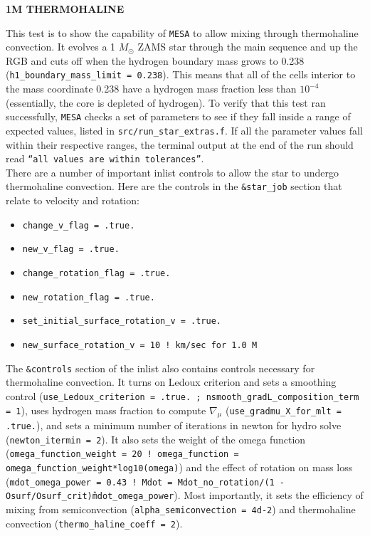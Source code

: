 \documentclass{article}
\begin{document}
	
	\begin{center}
	  \begin{Large}
	    \textbf{1M THERMOHALINE}\\
	  \end{Large}
	\end{center}

        This test is to show the capability of \texttt{MESA} to allow mixing through thermohaline convection.  It evolves a 1 $M_\odot$ ZAMS star through the main sequence and up the RGB and cuts off when the hydrogen boundary mass grows to 0.238 (\texttt{h1\_boundary\_mass\_limit = 0.238}).  This means that all of the cells interior to the mass coordinate 0.238 have a hydrogen mass fraction less than $10^{-4}$ (essentially, the core is depleted of hydrogen).  To verify that this test ran successfully, \texttt{MESA} checks a set of parameters to see if they fall inside a range of expected values, listed in \texttt{src/run\_star\_extras.f}.  If all the parameter values fall within their respective ranges, the terminal output at the end of the run should read \texttt{``all values are within tolerances''}.\\

        There are a number of important inlist controls to allow the star to undergo thermohaline convection.  Here are the controls in the \texttt{\&star\_job} section that relate to velocity and rotation:

        \begin{itemize}
        \item \texttt{change\_v\_flag = .true.}
        \item \texttt{new\_v\_flag = .true.}
        \item \texttt{change\_rotation\_flag = .true.}
        \item \texttt{new\_rotation\_flag = .true.}
        \item \texttt{set\_initial\_surface\_rotation\_v = .true.}
        \item \texttt{new\_surface\_rotation\_v = 10 ! km/sec    for 1.0 M}
        \end{itemize}

        The \texttt{\&controls} section of the inlist also contains controls necessary for thermohaline convection.  It turns on Ledoux criterion and sets a smoothing control (\texttt{use\_Ledoux\_criterion = .true. ; nsmooth\_gradL\_composition\_term = 1}), uses hydrogen mass fraction to compute $\nabla{_\mu}$ (\texttt{use\_gradmu\_X\_for\_mlt = .true.}), and sets a minimum number of iterations in newton for hydro solve (\texttt{newton\_itermin = 2}).  It also sets the weight of the omega function (\texttt{omega\_function\_weight = 20 ! omega\_function = omega\_function\_weight*log10(omega)}) and the effect of rotation on mass loss (\texttt{mdot\_omega\_power = 0.43 ! Mdot = Mdot\_no\_rotation/(1 - Osurf/Osurf\_crit)\^mdot\_omega\_power}).  Most importantly, it sets the efficiency of mixing from semiconvection (\texttt{alpha\_semiconvection = 4d-2}) and thermohaline convection (\texttt{thermo\_haline\_coeff = 2}).\\
\end{document}
